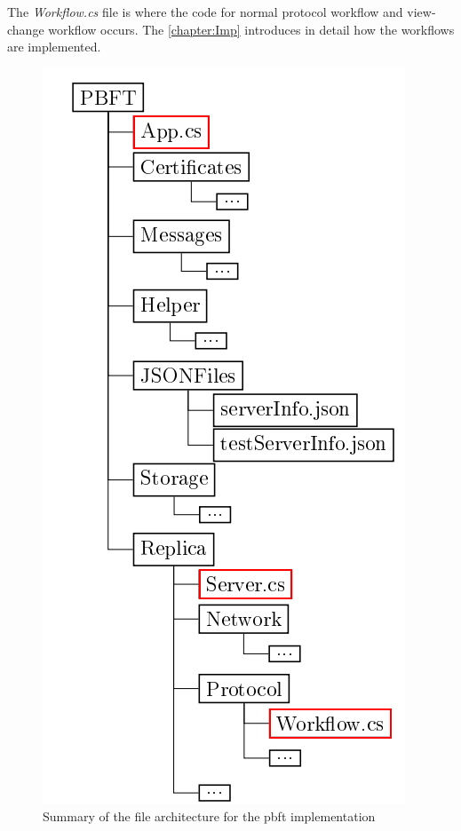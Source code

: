 The \emph{Workflow.cs} file is where the code for normal protocol workflow and view-change workflow occurs. The \autoref{chapter:Imp} introduces in detail how the workflows are implemented.
%

\begin{figure}[H]
	\includegraphics[width=0.45\linewidth]{figures/filestructtest}
	\caption{Summary of the file architecture for the \ac{pbft} implementation}
    \label{fig:filestruct}
\end{figure}

\newpage

